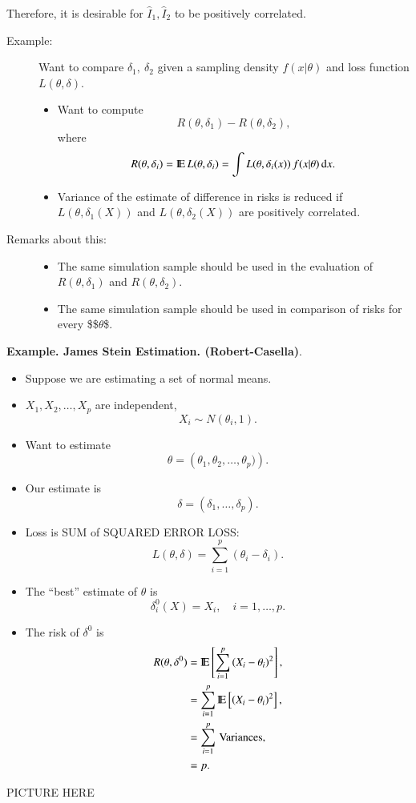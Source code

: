 \documentclass[captions=tableheading]{scrbook}
\begin{document}
Therefore, it is desirable for  \(\hat{I}_{1},\hat{I}_{2}\) to be positively correlated.



\begin{description}
\item[Example:] Want to compare \(\delta_{1},\ \delta_{2}\) given a sampling density $f(x|\theta)$ and loss function $L(\theta,\delta)$.
\begin{itemize}
\item Want to compute
    \[
    R(\theta,\delta_{1}) - R(\theta,\delta_{2}),
    \]
    where
    \[
    R(\theta,\delta_{i}) = \mathrm{I\hspace{-1.5pt}E}\,L(\theta,\delta_{i}) = \int L(\theta,\delta_{i}(x))\,f(x|\theta)\,\mathrm{d} x.
    \]
\item Variance of the estimate of difference in risks is reduced if $L(\theta,\delta_{1}(X))$ and $L(\theta,\delta_{2}(X))$ are positively correlated.
\end{itemize}
\item[Remarks about this:] 
\begin{itemize}
\item The same simulation sample should be used in the evaluation of $R(\theta,\delta_{1})$ and $R(\theta,\delta_{2})$.
\item The same simulation sample should be used in comparison of risks for every \$\$$\theta$\$.
\end{itemize}
\end{description}
\textbf{Example.  James Stein Estimation. (Robert-Casella)}.


\begin{itemize}
\item Suppose we are estimating a set of normal means.
\item \(X_{1},X_{2},\ldots,X_{p}\) are independent,
  \[
  X_{i} \sim N(\theta_{i},1).
  \]
\item Want to estimate
  \[
  \theta = \left(\theta_{1},\theta_{2},\ldots,\theta_{p}) \right).
  \]
\item Our estimate is
  \[
  \delta = \left(\delta_{1},\ldots,\delta_{p}  \right).
  \]
\item Loss is SUM of SQUARED ERROR LOSS:
  \[
  L(\theta,\delta) = \sum_{i=1}^{p}\left(\theta_{i} - \delta_{i} \right).
  \]
\item The ``best'' estimate of $\theta$ is
  \[
  \delta_{i}^{0}(X) = X_{i}, \quad i = 1,\ldots,p.
  \]
\item The risk of $\delta^{0}$ is
  \begin{align*}
  R(\theta,\delta^{0}) & = \mathrm{I\hspace{-1.5pt}E} \left[ \sum_{i=1}^{p}\left(X_{i}-\theta_{i} \right)^{2} \right],  \\
  & = \sum_{i=1}^{p} \mathrm{I\hspace{-1.5pt}E} \left[ \left(X_{i}-\theta_{i} \right)^{2} \right], \\
  & = \sum_{i=1}^{p} \, \mathrm{Variances},  \\
  & = p.
  \end{align*}
\end{itemize}
  PICTURE HERE
\end{document}
